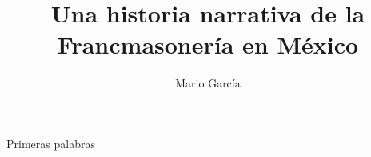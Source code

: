 \documentclass[openright]{book}
\title{Una historia narrativa de la Francmasonería en México}
\author{Mario García}
\begin{document}
\maketitle

Primeras palabras




\end{document}
